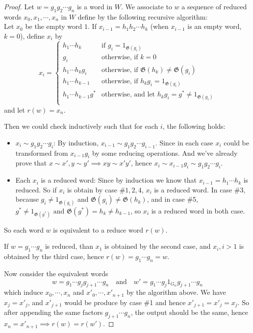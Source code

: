 \documentclass[a4paper]{article}
\theoremstyle{remark}
\theoremstyle{definition}
\theoremstyle{definition}
\theoremstyle{plain}
\newcommand{\gid}{\mathfrak{G}}
\begin{document}
  \begin{proof}
    Let $w = g_1 g_2 \cdots g_n$ is a word in $W$. We associate to $w$ a sequence of reduced words
    $x_0, x_1, \cdots, x_n$ in $W$ define by the following recursive algorithm: \\
    Let $x_0$ be the empty word $1$. If $x_{i-1} = h_1 h_2 \cdots h_k$ (when $x_{i-1}$ is an empty word, $k = 0$),
    define $x_i$ by
    \[
      x_i = \begin{cases}
        h_1 \cdots h_k & \text{if } g_i = 1_{\gid(g_i)} \\
        g_i & \text{otherwise, if } k = 0 \\
        h_1 \cdots h_k g_i & \text{otherwise, if } \gid(h_k) \neq \gid(g_i) \\
        h_1 \cdots h_{k-1} & \text{otherwise, if } h_k g_i = 1_{\gid(g_i)} \\
        h_1 \cdots h_{k-1} g^* & \text{otherwise, and let } h_k g_i = g^* \neq 1_{\gid(g_i)} \\
      \end{cases}
    \]
    and let $r(w) = x_n$.

    Then we could check inductively such that for each $i$, the following holds:
    \begin{itemize}
      \item $x_i \sim g_1 g_2 \cdots g_i$: By induction, $x_{i-1} \sim g_1 g_2 \cdots g_{i-1}$.
        Since in each case $x_i$ could be transformed from $x_{i-1} g_i$
        by some reducing operations. And we've already prove that $x \sim x', y \sim y' \implies xy \sim x'y'$,
        hence $x_i \sim x_{i-1} g_i \sim g_1 g_2 \cdots g_i$.
      \item Each $x_i$ is a reduced word: Since by induction we know that $x_{i-1} = h_1 \cdots h_k$ is reduced. 
        So if $x_i$ is obtain by case \#$1, 2, 4$, $x_i$ is a reduced word. In case \#3, because $g_i \neq 1_{\gid(g_i)}$
        and $\gid(g_i) \neq \gid(h_k)$, and in case \#5, $g^* \neq 1_{\gid(g^*)} \text{ and } \gid(g^*) = h_k \neq h_{k-1}$,
        so $x_i$ is a reduced word in both case.
    \end{itemize}
    So each word $w$ is equivalent to a reduce word $r(w)$.

    If $w = g_1 \cdots g_n$ is reduced, than $x_1$ is obtained by the second case, and $x_i, i > 1$ is
    obtained by the third case, hence $r(w) = g_1 \cdots g_n = w$.

    Now consider the equivalent words
    \[ w = g_1 \cdots g_j g_{j+1} \cdots g_n \quad\text{and}\quad w' = g_1 \cdots g_j 1_{G_\alpha} g_{j+1} \cdots g_n \]
    which induce $x_0, \cdots, x_n$ and $x'_0, \cdots, x'_{n+1}$ by the algorithm above.
    We have $x_j = x'_j$, and $x'_{j+1}$ would be produce by case \#1 and hence $x'_{j+1} = x'_j = x_j$.
    So after appending the same factors $g_{j+1} \cdots g_n$, the output should be the same, hence
    $x_n = x'_{n+1} \implies r(w) = r(w')$.


\end{proof}
\end{document}
